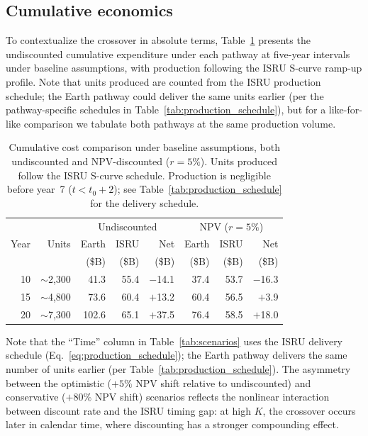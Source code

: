 \documentclass[preprint,12pt]{elsarticle}
\begin{document}
\subsection{Cumulative economics}

To contextualize the crossover in absolute terms, Table~\ref{tab:cumulative} presents the undiscounted cumulative expenditure under each pathway at five-year intervals under baseline assumptions, with production following the ISRU S-curve ramp-up profile. Note that units produced are counted from the ISRU production schedule; the Earth pathway could deliver the same units earlier (per the pathway-specific schedules in Table~\ref{tab:production_schedule}), but for a like-for-like comparison we tabulate both pathways at the same production volume.

\begin{table}[htbp]
\centering
\caption{Cumulative cost comparison under baseline assumptions, both undiscounted and NPV-discounted ($r = 5\%$). Units produced follow the ISRU S-curve schedule. Production is negligible before year~7 ($t < t_0 + 2$); see Table~\ref{tab:production_schedule} for the delivery schedule.}
\label{tab:cumulative}
\begin{tabular}{@{}rr|rrr|rrr@{}}
\toprule
 & & \multicolumn{3}{c|}{Undiscounted} & \multicolumn{3}{c}{NPV ($r = 5\%$)} \\
Year & Units & Earth & ISRU & Net & Earth & ISRU & Net \\
 & & (\$B) & (\$B) & (\$B) & (\$B) & (\$B) & (\$B) \\
\midrule
10 & $\sim$2{,}300 & 41.3  & 55.4   & $-$14.1 & 37.4  & 53.7  & $-$16.3 \\
15 & $\sim$4{,}800 & 73.6  & 60.4   & $+$13.2 & 60.4  & 56.5  & $+$3.9  \\
20 & $\sim$7{,}300 & 102.6 & 65.1   & $+$37.5 & 76.4  & 58.5  & $+$18.0 \\
\bottomrule
\end{tabular}
\end{table}

Note that the ``Time'' column in Table~\ref{tab:scenarios} uses the ISRU delivery schedule (Eq.~\ref{eq:production_schedule}); the Earth pathway delivers the same number of units earlier (per Table~\ref{tab:production_schedule}). The asymmetry between the optimistic ($+5\%$ NPV shift relative to undiscounted) and conservative ($+80\%$ NPV shift) scenarios reflects the nonlinear interaction between discount rate and the ISRU timing gap: at high $K$, the crossover occurs later in calendar time, where discounting has a stronger compounding effect.
\end{document}
